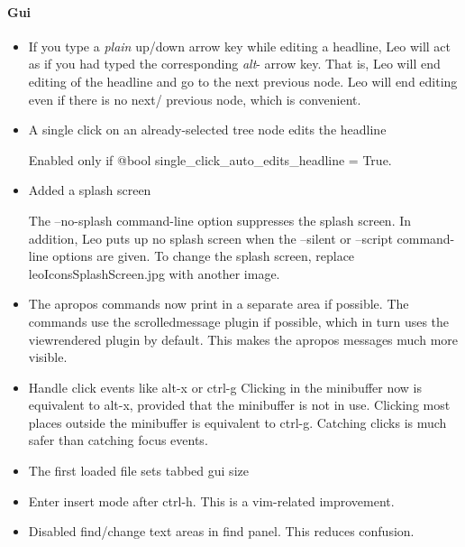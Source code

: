\documentclass[a4paper,10pt,english]{sphinxmanual}
\begin{document}
\paragraph{Gui}
\label{what-is-new:gui}\begin{itemize}
\item {} 
If you type a \emph{plain} up/down arrow key while editing a headline, Leo will act
as if you had typed the corresponding \emph{alt}- arrow key. That is, Leo will end
editing of the headline and go to the next previous node. Leo will end editing
even if there is no next/ previous node, which is convenient.

\item {} 
A single click on an already-selected tree node edits the headline

Enabled only if @bool single\_click\_auto\_edits\_headline = True.

\item {} 
Added a splash screen

The --no-splash command-line option suppresses the splash screen. In addition,
Leo puts up no splash screen when the --silent or --script command-line
options are given. To change the splash screen, replace
leoIconsSplashScreen.jpg with another image.

\item {} 
The apropos commands now print in a separate area if possible. The commands use
the scrolledmessage plugin if possible, which in turn uses the viewrendered
plugin by default. This makes the apropos messages much more visible.

\item {} 
Handle click events like alt-x or ctrl-g Clicking in the minibuffer now is
equivalent to alt-x, provided that the minibuffer is not in use. Clicking most
places outside the minibuffer is equivalent to ctrl-g. Catching clicks is much
safer than catching focus events.

\item {} 
The first loaded file sets tabbed gui size

\item {} 
Enter insert mode after ctrl-h.  This is a vim-related improvement.

\item {} 
Disabled find/change text areas in find panel.  This reduces confusion.

\end{itemize}
\end{document}
